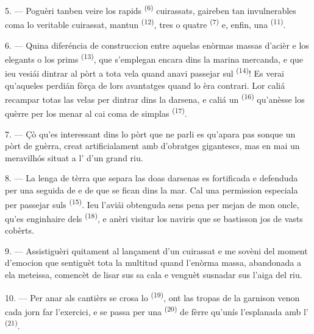 5. --- Poguèri tanben veire los rapids  \textsuperscript{(6)}
cuirassats, gaireben tan invulnerables coma lo veritable cuirassat, mantun
 \textsuperscript{(12)}, tres o quatre 
\textsuperscript{(7)} e, enfin, una  \textsuperscript{(11)}.

6. --- Quina diferéncia de construccion entre aquelas enòrmas massas d'acièr e los
elegants  o los prims 
\textsuperscript{(13)}, que s'emplegan encara dins la marina mercanda, e que ieu
vesiái dintrar al pòrt a tota vela quand anavi passejar sul 
\textsuperscript{(14)}! Es verai qu'aqueles perdián fòrça de lors avantatges quand
lo  èra contrari. Lor caliá recampar totas las velas per dintrar dins
la darsena, e caliá un  \textsuperscript{(16)} qu'anèsse los
quèrre per los menar al cai coma de simplas 
\textsuperscript{(17)}.

\VUsaut{3.0mm}
\VUsaut{3.0mm}

7. --- Çò qu'es interessant dins lo pòrt que ne parli es qu'apara pas sonque un
pòrt de guèrra, creat artificialament amb d'obratges gigantescs, mas en mai un
meravilhós  situat a l' d'un grand
riu.

8. --- La lenga de tèrra que separa las doas darsenas es fortificada e defenduda
per una seguida de  e de  que se fican dins la
mar. Cal una permission especiala per passejar suls 
\textsuperscript{(15)}. Ieu l'aviái obtenguda sens pena per mejan de mon oncle,
qu'es enginhaire dels  \textsuperscript{(18)}, e anèri visitar
los naviris que se bastisson jos de vasts cobèrts.

9. --- Assistiguèri quitament al lançament d'un cuirassat e me sovèni del moment
d'emocion que sentiguèt tota la multitud quand l'enòrma massa, abandonada a
ela meteissa, comencèt de lisar sus sa cala e venguèt susnadar sus l'aiga del riu.

10. --- Per anar als cantièrs se crosa lo 
\textsuperscript{(19)}, ont las tropas de la garnison venon cada jorn far
l'exercici, e se passa per una  \textsuperscript{(20)} de fèrre
qu'unís l'esplanada amb l' \textsuperscript{(21)}.

